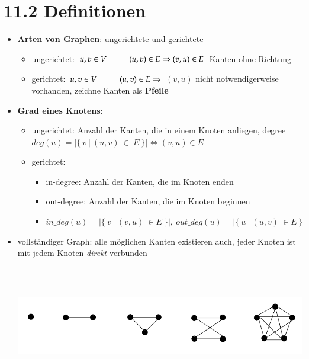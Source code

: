 \documentclass[11pt, fleqn]{scrreprt}
\begin{document}
\section*{11.2 Definitionen}
\begin{itemize}
    \item \textbf{Arten von Graphen}: ungerichtete und gerichtete
    \begin{itemize}
        \item ungerichtet: $u, v \in V \hspace*{1cm} (u,v) \in E \Rightarrow (v, u) \in E$ Kanten ohne Richtung
        \item gerichtet: $u, v \in V \hspace*{1cm} (u,v) \in E \Rightarrow$ $(v, u)$ nicht notwendigerweise vorhanden, zeichne Kanten als \textbf{Pfeile}
        \end{itemize}
        \item \textbf{Grad eines Knotens}:
        \begin{itemize}
        \item ungerichtet: Anzahl der Kanten, die in einem Knoten anliegen, \glqq degree\grqq \\
        $deg(u) = | \{ \ v\  | \ (u,v)\  \in \ E\ \}| \Leftrightarrow (v,u) \in E$
        \item gerichtet:
        \begin{itemize}
            \item in-degree: Anzahl der Kanten, die im Knoten enden
            \item out-degree: Anzahl der Kanten, die im Knoten beginnen
            \item $in\_deg(u) = |\{ \  v \ |\  (v,u) \ \in E\ \}|, \ out\_deg(u) = |\{\  u\  |\  (u,v) \ \in E\ \}|$
        \end{itemize}
        \end{itemize}
            \item vollständiger Graph: alle möglichen Kanten existieren auch, jeder Knoten ist mit jedem Knoten \emph{direkt} verbunden\\
            \includegraphics[width=15cm,height=6cm,keepaspectratio]{./Pictures/vollstGraphen.png}\\

\end{itemize}
\end{document}
